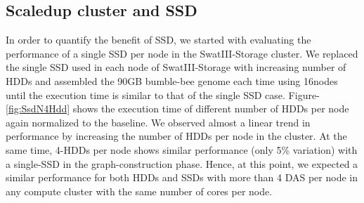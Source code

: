 \documentclass[conference]{IEEEtran}
\begin{document}
\subsection {Scaledup cluster and SSD} \label{ScaledupClusterAndSSD}
In order to quantify the benefit of SSD, we started with evaluating the performance of a single SSD per node in the SwatIII-Storage cluster. 
We replaced the single SSD used in each node of SwatIII-Storage with increasing number of HDDs and assembled the 90GB bumble-bee genome each time using 16nodes until the  execution time is similar to that of the single SSD case.
Figure-\ref{fig:SsdN4Hdd} shows the execution time of different number of HDDs per node again normalized to the baseline.
We observed almost a linear trend in performance by increasing the number of HDDs per node in the cluster.
At the same time, 4-HDDs per node shows similar performance (only 5\% variation) with a single-SSD in the graph-construction phase.
Hence, at this point, we expected a similar performance for both HDDs and SSDs with more than 4 DAS per node in any compute cluster with the same number of cores per node.
\end{document}
